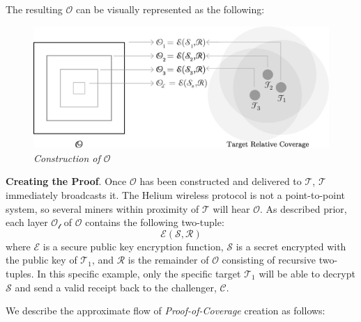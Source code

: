 \documentclass[letterpaper,11pt]{article}
\def\proofofcoverage/{\textit{Proof-of-Coverage}}
\begin{document}
The resulting $\mathcal{O}$ can be visually represented as the following:\newline

\begin{figure}[H]
	\begin{center}
  		\includegraphics[width=\textwidth]{diagram3.eps}
  		\caption{\textit{Construction of $\mathcal{O}$}}
  		\label{fig:onion-packet}
 	\end{center}
\end{figure}

\textbf{Creating the Proof}. Once $\mathcal{O}$ has been constructed and delivered to $\mathcal{T}$, $\mathcal{T}$ immediately broadcasts it. The Helium wireless protocol is not a point-to-point system, so several miners within proximity of $\mathcal{T}$ will hear $\mathcal{O}$. As described prior, each layer $\mathcal{O_l}$ of $\mathcal{O}$ contains the following two-tuple: $$\mathcal{E}(\mathcal{S}, \mathcal{R})$$ where $\mathcal{E}$ is a secure public key encryption function, $\mathcal{S}$ is a secret encrypted with the public key of $\mathcal{T_1}$, and $\mathcal{R}$ is the remainder of $\mathcal{O}$ consisting of recursive two-tuples. In this specific example, only the specific target $\mathcal{T_1}$ will be able to decrypt $\mathcal{S}$ and send a valid receipt back to the challenger, $\mathcal{C}$.\newline

We describe the approximate flow of \proofofcoverage/ creation as follows:
\end{document}
